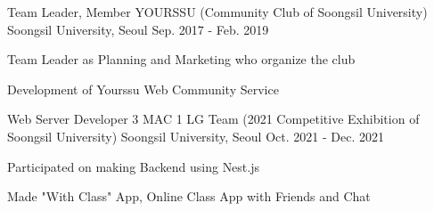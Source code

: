 
\begin{cventries}
  \cventry
    {Team Leader, Member} %
    {YOURSSU (Community Club of Soongsil University)} %
    {Soongsil University, Seoul} %
    {Sep. 2017 - Feb. 2019} %
    {
      \begin{cvitems} %
        \item {Team Leader as Planning and Marketing who organize the club}
        \item {Development of Yourssu Web Community Service }
      \end{cvitems}
    }
    
  \cventry
    {Web Server Developer} %
    {3 MAC 1 LG Team (2021 Competitive Exhibition of Soongsil University)} %
    {Soongsil University, Seoul} %
    {Oct. 2021 - Dec. 2021} %
    {
      \begin{cvitems} %
        \item {Participated on making Backend using Nest.js}
        \item {Made "With Class" App, Online Class App with Friends and Chat}
      \end{cvitems}
    }

\end{cventries}
